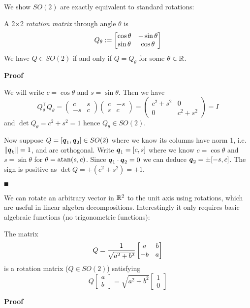 We show $SO(2)$ are exactly equivalent to standard rotations:

\begin{proposition} A 2\ensuremath{\times}2 \emph{rotation matrix} through angle $\ensuremath{\theta}$ is
\[
Q_\ensuremath{\theta} := \begin{bmatrix} \cos \ensuremath{\theta} & -\sin \ensuremath{\theta} \cr \sin \ensuremath{\theta} & \cos \ensuremath{\theta} \end{bmatrix}
\]
We have $Q \ensuremath{\in} SO(2)$ if and only if $Q = Q_\ensuremath{\theta}$ for some $\theta \in {\mathbb R}$.

\end{proposition}
\textbf{Proof}

We will write $c = \cos \ensuremath{\theta}$ and $s = \sin \ensuremath{\theta}$. Then we have
\[
Q_\ensuremath{\theta}^\ensuremath{\top}Q_\ensuremath{\theta} = \begin{pmatrix} c & s \\ -s & c \end{pmatrix} \begin{pmatrix} c & -s \\ s & c \end{pmatrix} = 
\begin{pmatrix} c^2 + s^2 & 0 \\ 0 & c^2 + s^2 \end{pmatrix} = I
\]
and $\det Q_\ensuremath{\theta} = c^2 + s^2 = 1$ hence $Q_\ensuremath{\theta} \ensuremath{\in} SO(2)$. 

Now suppose $Q = [\bm{{\mbox{\boldmath$q$\unboldmath}}}_1, \bm{{\mbox{\boldmath$q$\unboldmath}}}_2] \in SO(2)$ where we know its columns have norm 1, i.e. $\|\bm{{\mbox{\boldmath$q$\unboldmath}}}_k\| = 1$, and are orthogonal. Write $\bm{{\mbox{\boldmath$q$\unboldmath}}}_1 = [c,s]$ where we know $c = \cos \ensuremath{\theta}$ and $s = \sin \ensuremath{\theta}$ for $\ensuremath{\theta} = {\rm atan}(s, c)$.  Since $\bm{{\mbox{\boldmath$q$\unboldmath}}}_1\cdot \bm{{\mbox{\boldmath$q$\unboldmath}}}_2 = 0$ we can deduce $\bm{{\mbox{\boldmath$q$\unboldmath}}}_2 = \pm [-s,c]$. The sign is positive as $\det Q = \ensuremath{\pm}(c^2 + s^2) = \ensuremath{\pm}1$.

\ensuremath{\QED}

We can rotate an arbitrary vector in ${\mathbb R}^2$ to the unit axis using rotations, which are useful in linear algebra decompositions. Interestingly it only requires basic algebraic functions (no trigonometric functions):

\begin{proposition}  The matrix
\[
Q = {1 \over \sqrt{a^2 + b^2}}
\begin{bmatrix}
 a & b \cr -b & a
\end{bmatrix}
\]
is a rotation matrix ($Q \ensuremath{\in} SO(2)$) satisfying
\[
Q \begin{bmatrix} a \\ b \end{bmatrix} = \sqrt{a^2 + b^2} \begin{bmatrix} 1 \\ 0 \end{bmatrix}
\]
\end{proposition}
\textbf{Proof} 

